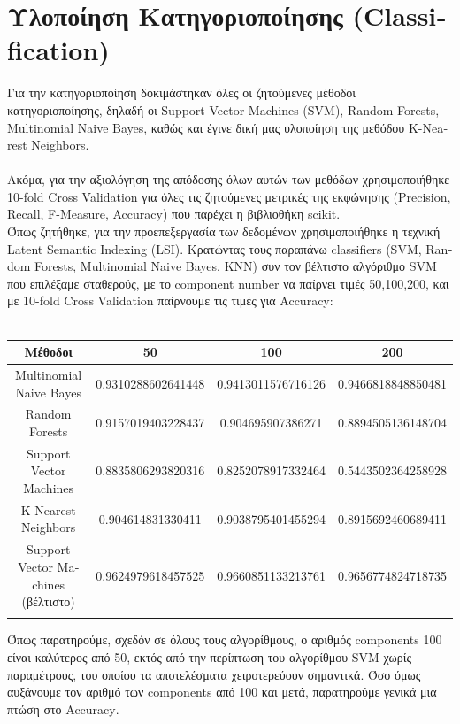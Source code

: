 \documentclass{article}
\begin{document}
\section{Υλοποίηση Κατηγοριοποίησης \textlatin{(Classification)}}
Για την κατηγοριοποίηση δοκιμάστηκαν όλες οι ζητούμενες μέθοδοι κατηγοριοποίησης, δηλαδή οι 
\textlatin{Support Vector Machines (SVM), Random Forests, Multinomial Naive Bayes}, καθώς και 
έγινε δική μας υλοποίηση της μεθόδου \textlatin{K-Nearest Neighbors}.\\\\
Ακόμα, για την αξιολόγηση της απόδοσης όλων αυτών των μεθόδων χρησιμοποιήθηκε
\textlatin{10-fold Cross Validation} για όλες τις ζητούμενες μετρικές της εκφώνησης
\textlatin{(Precision, Recall, F-Measure, Accuracy)} που παρέχει η βιβλιοθήκη \textlatin{scikit}.\\
Όπως ζητήθηκε, για την προεπεξεργασία των δεδομένων χρησιμοποιήθηκε η τεχνική 
\textlatin{Latent Semantic Indexing (LSI)}. Κρατώντας τους παραπάνω \textlatin{classifiers} 
(\textlatin{SVM, Random Forests, Multinomial Naive Bayes, KNN}) συν τον βέλτιστο αλγόριθμο \textlatin{SVM} 
που επιλέξαμε σταθερούς, με το 
\textlatin{component number} να παίρνει τιμές 50,100,200, και με \textlatin{10-fold Cross Validation}
παίρνουμε τις τιμές για \textlatin{Accuracy}:\\\\

\renewcommand{\arraystretch}{2.5}
\begin{tabular}{ c c|c|c|}
\hline  
 Μέθοδοι & 50 & 100 & 200\\
\hline 
\textlatin{Multinomial Naive Bayes} & 0.9310288602641448 & 0.9413011576716126	 & 0.9466818848850481\\
\hline 
\textlatin{Random Forests} & 0.9157019403228437 & 0.904695907386271 & 0.8894505136148704\\
\hline
\textlatin{Support Vector Machines} & 0.8835806293820316 & 0.8252078917332464 & 0.5443502364258928\\
\hline
\textlatin{K-Nearest Neighbors} & 0.904614831330411 & 0.9038795401455294 & 0.8915692460689411\\
\hline
\textlatin{Support Vector Machines} (βέλτιστο) & 0.9624979618457525 & 0.9660851133213761 & 0.9656774824718735\\
\hline\\
\end{tabular}

Όπως παρατηρούμε, σχεδόν σε όλους τους αλγορίθμους, ο αριθμός \textlatin{components} 100 είναι καλύτερος από 
50, εκτός από την περίπτωση του αλγορίθμου \textlatin{SVM} χωρίς παραμέτρους, του οποίου τα αποτελέσματα χειροτερεύουν
σημαντικά. 
Όσο όμως αυξάνουμε τον αριθμό των \textlatin{components} από 100 και μετά, παρατηρούμε γενικά μια πτώση στο 
\textlatin{Accuracy}.\\\\
\end{document}
